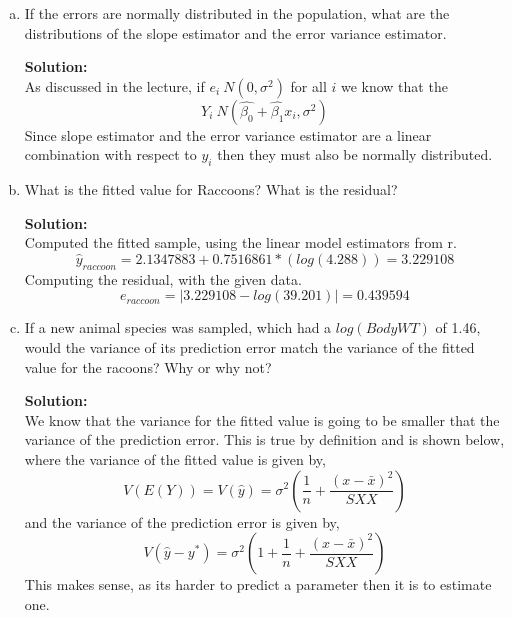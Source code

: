 \documentclass[12pt]{article}
\makeatletter
\theoremstyle{homework}
\newenvironment{exercise}[1]
{\def\@currentlabel{#1}\exercisecore}
{\endexercisecore}
\newcommand{\localhead}[1]{\par\smallskip\noindent\textbf{#1}\nobreak\\}%
\newcommand\solution{\localhead{Solution:}}
\makeatother
\begin{document}
\begin{exercise}{3}
\begin{enumerate}[a.]
  \item If the errors are normally distributed in the population, what are the distributions of 
  the slope estimator and the error variance estimator. \\
  \solution As discussed in the lecture, if $e_i ~ N(0,\sigma^2)$ for all $i$ we know that the 
  \begin{equation*}
    Y_i ~ N(\hat{\beta_0}+\hat{\beta_1}x_i, \sigma^2)
  \end{equation*}
  Since slope estimator and the error variance estimator are a linear combination with respect to $y_i$
  then they must also be normally distributed. 
  \vspace{.15in}

  \item What is the fitted value for Raccoons? What is the residual?\\
  \solution Computed the fitted sample, using the linear model estimators from r. 
  \begin{equation*}
    \hat{y}_{raccoon} = 2.1347883 + 0.7516861*(log(4.288)) = 3.229108
  \end{equation*}
  Computing the residual, with the given data.
  \begin{equation*}
    e_{raccoon} = |3.229108 - log(39.201)| = 0.439594
  \end{equation*}
  \vspace{.15in}

  \item If a new animal species was sampled, which had a $log(BodyWT)$ of 1.46, would the variance 
  of its prediction error match the variance of the fitted value for the racoons? Why or why not?\\
  \solution  We know that the variance for the fitted value is going to be smaller that the variance of the prediction error.
  This is true by definition and is shown below, where the variance of the fitted value is given by, 
  \begin{equation*}
    V(E(Y)) = V(\hat{y}) = \sigma^2 \left(\frac{1}{n} + \frac{(x - \bar{x})^2}{SXX}\right)
  \end{equation*}
  and the variance of the prediction error is given by, 
  \begin{equation*}
    V(\hat{y} - y^*) =  \sigma^2 \left(1 + \frac{1}{n} + \frac{(x - \bar{x})^2}{SXX}\right)
  \end{equation*}
  This makes sense, as its harder to predict a parameter then it is to estimate one. 


    

    
    
  \end{enumerate}
  
\end{exercise}
\end{document}
